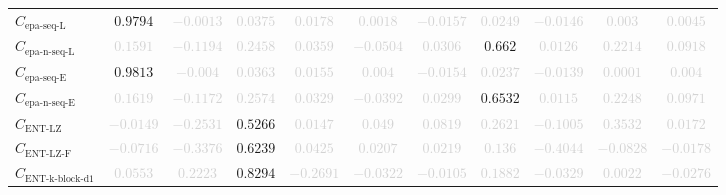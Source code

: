 \documentclass{standalone}
\newcommand{\entlempelzivname}{\text{ENT-LZ}}
\newcommand{\entlempelziv}{C_{\entlempelzivname}}
\newcommand{\entlempelzivflatname}{\text{ENT-LZ-F}}
\newcommand{\entlempelzivflat}{C_{\entlempelzivflatname}}
\newcommand{\entkblockdonename}{\text{ENT-k-block-d1}}
\newcommand{\entkblockdone}{C_{\entkblockdonename}}
\newcommand{\epasequencelname}{\text{epa-seq-L}}
\newcommand{\epasequencel}{C_{\epasequencelname}}
\newcommand{\epanormsequencelname}{\text{epa-n-seq-L}}
\newcommand{\epanormsequencel}{C_{\epanormsequencelname}}
\newcommand{\epasequenceename}{\text{epa-seq-E}}
\newcommand{\epasequencee}{C_{\epasequenceename}}
\newcommand{\epanormsequenceename}{\text{epa-n-seq-E}}
\newcommand{\epanormsequencee}{C_{\epanormsequenceename}}
\begin{document}
\begin{tabular}{lcccccccccc}
$\epasequencel$ & $0.9794$ & \textcolor{lightgray}{$-0.0013$} & \textcolor{lightgray}{$0.0375$} & \textcolor{lightgray}{$0.0178$} & \textcolor{lightgray}{$0.0018$} & \textcolor{lightgray}{$-0.0157$} & \textcolor{lightgray}{$0.0249$} & \textcolor{lightgray}{$-0.0146$} & \textcolor{lightgray}{$0.003$} & \textcolor{lightgray}{$0.0045$} \\ 
$\epanormsequencel$ & \textcolor{lightgray}{$0.1591$} & \textcolor{lightgray}{$-0.1194$} & \textcolor{lightgray}{$0.2458$} & \textcolor{lightgray}{$0.0359$} & \textcolor{lightgray}{$-0.0504$} & \textcolor{lightgray}{$0.0306$} & $0.662$ & \textcolor{lightgray}{$0.0126$} & \textcolor{lightgray}{$0.2214$} & \textcolor{lightgray}{$0.0918$} \\ 
$\epasequencee$ & $0.9813$ & \textcolor{lightgray}{$-0.004$} & \textcolor{lightgray}{$0.0363$} & \textcolor{lightgray}{$0.0155$} & \textcolor{lightgray}{$0.004$} & \textcolor{lightgray}{$-0.0154$} & \textcolor{lightgray}{$0.0237$} & \textcolor{lightgray}{$-0.0139$} & \textcolor{lightgray}{$0.0001$} & \textcolor{lightgray}{$0.004$} \\ 
$\epanormsequencee$ & \textcolor{lightgray}{$0.1619$} & \textcolor{lightgray}{$-0.1172$} & \textcolor{lightgray}{$0.2574$} & \textcolor{lightgray}{$0.0329$} & \textcolor{lightgray}{$-0.0392$} & \textcolor{lightgray}{$0.0299$} & $0.6532$ & \textcolor{lightgray}{$0.0115$} & \textcolor{lightgray}{$0.2248$} & \textcolor{lightgray}{$0.0971$} \\ 
$\entlempelziv$ & \textcolor{lightgray}{$-0.0149$} & \textcolor{lightgray}{$-0.2531$} & $0.5266$ & \textcolor{lightgray}{$0.0147$} & \textcolor{lightgray}{$0.049$} & \textcolor{lightgray}{$0.0819$} & \textcolor{lightgray}{$0.2621$} & \textcolor{lightgray}{$-0.1005$} & \textcolor{lightgray}{$0.3532$} & \textcolor{lightgray}{$0.0172$} \\ 
$\entlempelzivflat$ & \textcolor{lightgray}{$-0.0716$} & \textcolor{lightgray}{$-0.3376$} & $0.6239$ & \textcolor{lightgray}{$0.0425$} & \textcolor{lightgray}{$0.0207$} & \textcolor{lightgray}{$0.0219$} & \textcolor{lightgray}{$0.136$} & \textcolor{lightgray}{$-0.4044$} & \textcolor{lightgray}{$-0.0828$} & \textcolor{lightgray}{$-0.0178$} \\ 
$\entkblockdone$ & \textcolor{lightgray}{$0.0553$} & \textcolor{lightgray}{$0.2223$} & $0.8294$ & \textcolor{lightgray}{$-0.2691$} & \textcolor{lightgray}{$-0.0322$} & \textcolor{lightgray}{$-0.0105$} & \textcolor{lightgray}{$0.1882$} & \textcolor{lightgray}{$-0.0329$} & \textcolor{lightgray}{$0.0022$} & \textcolor{lightgray}{$-0.0276$} \\ 

\end{tabular}
\end{document}
